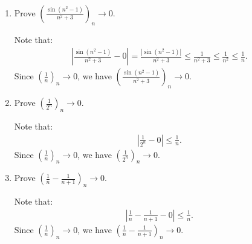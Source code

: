     \begin{example}
        \phantom{a}
        \begin{enumerate}[label = (\arabic*)]
            \item Prove $\left(\frac{\sin(n^2 - 1)}{n^2 + 3}\right)_n \rightarrow 0$.
                \begin{solution}
                    Note that:
                        \begin{equation*}
                        \begin{split}
                            \left|\frac{\sin(n^2 - 1)}{n^2 + 3} - 0 \right|
                            = \frac{|\sin(n^2 - 1)|}{n^2 + 3} 
                            \leq \frac{1}{n^2 + 3} 
                            \leq \frac{1}{n^2} 
                            \leq \frac{1}{n}.
                        \end{split}
                        \end{equation*}
                    Since $\left(\frac{1}{n}\right)_n \rightarrow 0$, we have $\left(\frac{\sin(n^2 - 1)}{n^2 + 3}\right)_n \rightarrow 0$.
                    \end{solution}
            
            \item Prove $\left(\frac{1}{2^n}\right)_n \rightarrow 0$.
                \begin{solution}
                    Note that:
                        \begin{equation*}
                        \begin{split}
                            \left|\frac{1}{2^n} - 0\right| \leq \frac{1}{n}.
                        \end{split}
                        \end{equation*}
                    Since $\left(\frac{1}{n}\right)_n \rightarrow 0$, we have $\left(\frac{1}{2^n}\right)_n \rightarrow 0$.
                \end{solution}

            \item Prove $\left(\frac{1}{n} - \frac{1}{n+1}\right)_n \rightarrow 0$.
                \begin{solution}
                    Note that:
                        \begin{equation*}
                        \begin{split}
                            \left|\frac{1}{n} - \frac{1}{n+1} - 0\right| \leq \frac{1}{n}.
                        \end{split}
                        \end{equation*}
                        Since $\left(\frac{1}{n}\right)_n \rightarrow 0$, we have $\left(\frac{1}{n} - \frac{1}{n+1}\right)_n \rightarrow 0$.
                \end{solution}
        \end{enumerate}
    \end{example}

